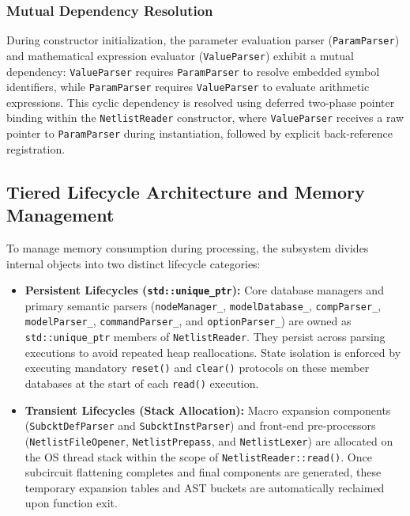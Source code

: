 \subsubsection{Mutual Dependency Resolution}
During constructor initialization, the parameter evaluation parser (\texttt{ParamParser}) and mathematical expression evaluator (\texttt{ValueParser}) exhibit a mutual dependency: \texttt{ValueParser} requires \texttt{ParamParser} to resolve embedded symbol identifiers, while \texttt{ParamParser} requires \texttt{ValueParser} to evaluate arithmetic expressions. This cyclic dependency is resolved using deferred two-phase pointer binding within the \texttt{NetlistReader} constructor, where \texttt{ValueParser} receives a raw pointer to \texttt{ParamParser} during instantiation, followed by explicit back-reference registration.

\subsection{Tiered Lifecycle Architecture and Memory Management}

To manage memory consumption during processing, the subsystem divides internal objects into two distinct lifecycle categories:

\begin{itemize}
    \item \textbf{Persistent Lifecycles (\texttt{std::unique\_ptr}):} Core database managers and primary semantic parsers (\texttt{nodeManager\_}, \texttt{modelDatabase\_}, \texttt{compParser\_}, \texttt{modelParser\_}, \texttt{commandParser\_}, and \texttt{optionParser\_}) are owned as \texttt{std::unique\_ptr} members of \texttt{NetlistReader}. They persist across parsing executions to avoid repeated heap reallocations. State isolation is enforced by executing mandatory \texttt{reset()} and \texttt{clear()} protocols on these member databases at the start of each \texttt{read()} execution.
    \item \textbf{Transient Lifecycles (Stack Allocation):} Macro expansion components (\texttt{SubcktDefParser} and \texttt{SubcktInstParser}) and front-end pre-processors (\texttt{NetlistFileOpener}, \texttt{NetlistPrepass}, and \texttt{NetlistLexer}) are allocated on the OS thread stack within the scope of \texttt{NetlistReader::read()}. Once subcircuit flattening completes and final components are generated, these temporary expansion tables and AST buckets are automatically reclaimed upon function exit.
\end{itemize}

